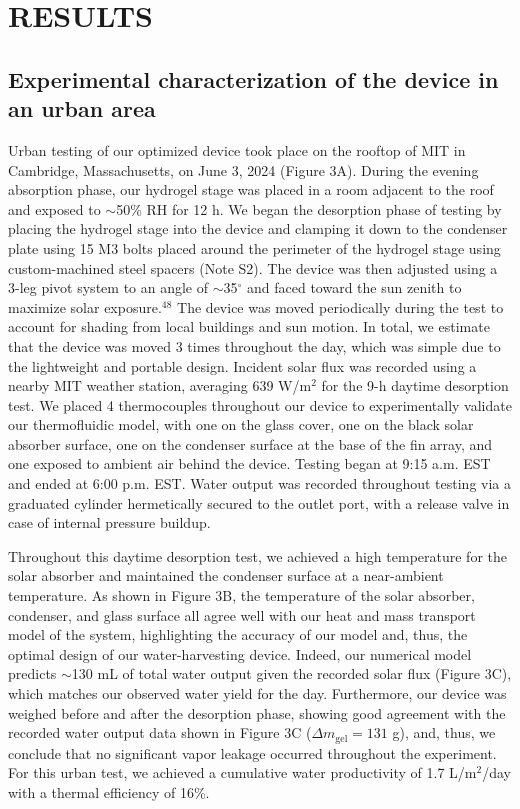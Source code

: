 \documentclass[11pt]{article}
\begin{document}
\section{RESULTS}

\subsection{Experimental characterization of the device in an urban area}

Urban testing of our optimized device took place on the rooftop of MIT in Cambridge, Massachusetts, on June 3, 2024 (Figure 3A). During the evening absorption phase, our hydrogel stage was placed in a room adjacent to the roof and exposed to $\sim$50\% RH for 12 h. We began the desorption phase of testing by placing the hydrogel stage into the device and clamping it down to the condenser plate using 15 M3 bolts placed around the perimeter of the hydrogel stage using custom-machined steel spacers (Note S2). The device was then adjusted using a 3-leg pivot system to an angle of $\sim$35$^{\circ}$ and faced toward the sun zenith to maximize solar exposure.$^{48}$ The device was moved periodically during the test to account for shading from local buildings and sun motion. In total, we estimate that the device was moved 3 times throughout the day, which was simple due to the lightweight and portable design. Incident solar flux was recorded using a nearby MIT weather station, averaging 639 W/m$^{2}$ for the 9-h daytime desorption test. We placed 4 thermocouples throughout our device to experimentally validate our thermofluidic model, with one on the glass cover, one on the black solar absorber surface, one on the condenser surface at the base of the fin array, and one exposed to ambient air behind the device. Testing began at 9:15 a.m. EST and ended at 6:00 p.m. EST. Water output was recorded throughout testing via a graduated cylinder hermetically secured to the outlet port, with a release valve in case of internal pressure buildup.

Throughout this daytime desorption test, we achieved a high temperature for the solar absorber and maintained the condenser surface at a near-ambient temperature. As shown in Figure 3B, the temperature of the solar absorber, condenser, and glass surface all agree well with our heat and mass transport model of the system, highlighting the accuracy of our model and, thus, the optimal design of our water-harvesting device. Indeed, our numerical model predicts $\sim$130 mL of total water output given the recorded solar flux (Figure 3C), which matches our observed water yield for the day. Furthermore, our device was weighed before and after the desorption phase, showing good agreement with the recorded water output data shown in Figure 3C ($\Delta m_{\mathrm{gel}} = 131$ g), and, thus, we conclude that no significant vapor leakage occurred throughout the experiment. For this urban test, we achieved a cumulative water productivity of 1.7 L/m$^{2}$/day with a thermal efficiency of 16\%.
\end{document}
